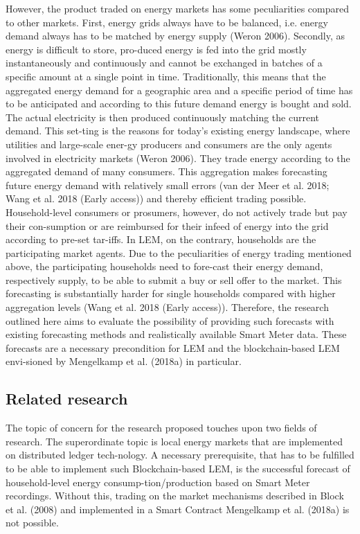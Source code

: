 However, the product traded on energy markets has some peculiarities compared to other markets. First, energy grids always have to be balanced, i.e. energy demand always has to be matched by energy supply (Weron 2006). Secondly, as energy is difficult to store, pro-duced energy is fed into the grid mostly instantaneously and continuously and cannot be exchanged in batches of a specific amount at a single point in time. Traditionally, this means that the aggregated energy demand for a geographic area and a specific period of time has to be anticipated and according to this future demand energy is bought and sold. The actual electricity is then produced continuously matching the current demand. This set-ting is the reasons for today’s existing energy landscape, where utilities and large-scale ener-gy producers and consumers are the only agents involved in electricity markets (Weron 2006). They trade energy according to the aggregated demand of many consumers. This aggregation makes forecasting future energy demand with relatively small errors (van der Meer et al. 2018; Wang et al. 2018 (Early access)) and thereby efficient trading possible. Household-level consumers or prosumers, however, do not actively trade but pay their con-sumption or are reimbursed for their infeed of energy into the grid according to pre-set tar-iffs. In LEM, on the contrary, households are the participating market agents. Due to the peculiarities of energy trading mentioned above, the participating households need to fore-cast their energy demand, respectively supply, to be able to submit a buy or sell offer to the market. This forecasting is substantially harder for single households compared with higher aggregation levels (Wang et al. 2018 (Early access)).
Therefore, the research outlined here aims to evaluate the possibility of providing such forecasts with existing forecasting methods and realistically available Smart Meter data. These forecasts are a necessary precondition for LEM and the blockchain-based LEM envi-sioned by Mengelkamp et al. (2018a) in particular.


\subsection{Related research}\label{Sec:Intro;Subsec:Related}
The topic of concern for the research proposed touches upon two fields of research. The superordinate topic is local energy markets that are implemented on distributed ledger tech-nology. A necessary prerequisite, that has to be fulfilled to be able to implement such Blockchain-based LEM, is the successful forecast of household-level energy consump-tion/production based on Smart Meter recordings. Without this, trading on the market mechanisms described in Block et al. (2008) and implemented in a Smart Contract Mengelkamp et al. (2018a) is not possible.


